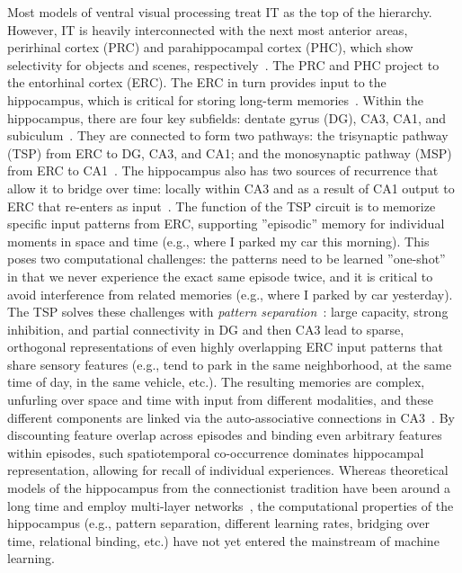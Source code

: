 Most models of ventral visual processing treat IT as the top of
the hierarchy. However, IT is heavily interconnected with
the next most anterior areas, perirhinal cortex (PRC) and
parahippocampal cortex (PHC), which show selectivity for
objects and scenes,
respectively~\citep{Barense:2010,Davachi:2006,Ranganath:2012}. The PRC
and PHC project to the entorhinal cortex (ERC). The ERC in turn
provides input to the hippocampus, which is critical for storing
long-term memories~\citep{Squire:1992}. Within the hippocampus, there
are four key subfields: dentate gyrus (DG), CA3, CA1, and
subiculum~\citep{Deng:2010,Shohamy:2013}. They are
connected to form two pathways: the trisynaptic pathway (TSP) from ERC
to DG, CA3, and CA1; and the monosynaptic pathway (MSP) from ERC to
CA1~\citep{Schapiro:2017}. The hippocampus also has two sources of
recurrence that allow it to bridge over time: locally within CA3 and
as a result of CA1 output to ERC that re-enters as
input~\citep{Kumaran:2016}. The function of the TSP circuit is to
memorize specific input patterns from ERC, supporting ''episodic''
memory for individual moments in space and time (e.g., where I parked
my car this morning). This poses two computational challenges: the
patterns need to be learned ''one-shot'' in that we never experience
the exact same episode twice, and it is critical to avoid interference
from related memories (e.g., where I parked by car yesterday). The TSP
solves these challenges with \textit{pattern
separation}~\citep{Leutgeb:2007,Yassa:2011,Rolls:2016}: large capacity,
strong inhibition, and partial connectivity in DG and then CA3 lead to
sparse, orthogonal representations of even highly overlapping ERC
input patterns that share sensory features (e.g., tend to park in
the same neighborhood, at the same time of day, in the same vehicle,
etc.). The resulting memories are complex, unfurling over space and
time with input from different modalities, and these different
components are linked via the auto-associative connections in
CA3~\citep{Wallenstein:1998}. By discounting feature overlap across
episodes and binding even arbitrary features within episodes, such
spatiotemporal co-occurrence dominates hippocampal representation, allowing for recall of individual experiences.
Whereas theoretical models of the hippocampus from the connectionist
tradition have been around a long time and employ multi-layer
networks~\citep{McClelland:1995,Norman:2003}, the computational
properties of the hippocampus (e.g., pattern separation, different
learning rates, bridging over time, relational binding, etc.) have not
yet entered the mainstream of machine learning.

